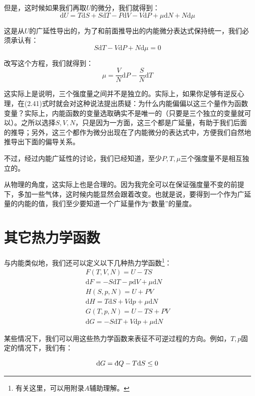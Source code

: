 \documentclass[a4paper, 10pt, openany]{book}%
\begin{document}
但是，这时候如果我们再取$U$的微分，我们就得到：
\begin{equation}
  \mathrm{d}U=T\mathrm{d}S+S\mathrm{d}T-P\mathrm{d}V-V\mathrm{d}P+\mu\mathrm{d}N+N\mathrm{d}\mu
\end{equation}

这是从$U$的广延性导出的，为了和前面推导出的内能微分表达式保持统一，我们必须承认有：
\begin{equation}
  S\mathrm{d}T-V\mathrm{d}P+N\mathrm{d}\mu=0
\end{equation}

改写这个方程，我们就得到：
\begin{equation}
  \mu=\frac{V}{N}\mathrm{d}P-\frac{S}{N}\mathrm{d}T\end{equation}

这实际上是说明，三个强度量之间并不是独立的。实际上，如果你足够有逆反心理，在(2.41)式时就会对这种说法提出质疑：为什么内能偏偏以这三个量作为函数变量？实际上，内能函数的变量选取确实不是唯一的（只要是三个独立的变量就可以）。之所以选择$S,V,N$，只是因为一方面，这三个都是广延量，有助于我们后面的推导；另外，这三个都作为微分出现在了内能微分的表达式中，方便我们自然地推导出下面的偏导关系。

不过，经过内能广延性的讨论，我们已经知道，至少$P,T,\mu$三个强度量不是相互独立的。

从物理的角度，这实际上也是合理的。因为我完全可以在保证强度量不变的前提下，多加一些气体，这时候内能显然会跟着改变。也就是说，要得到一个作为广延量的内能的值，我们至少要知道一个广延量作为“数量”的量度。
\section{ 其它热力学函数}
与内能类似地，我们还可以定义以下几种热力学函数\footnote{有关这里，可以用附录$A$辅助理解。}：
\begin{align}
  F(T,V,N)=U-TS\\
  \mathrm{d}F=-S\mathrm{d}T-p\mathrm{d}V+\mu\mathrm{d}N\\
  H(S,p,N)=U+PV\\
  \mathrm{d}H=T\mathrm{d}S+V\mathrm{d}p+\mu\mathrm{d}N\\
  G(T,p,N)=U-TS+PV\\
  \mathrm{d}G=-S\mathrm{d}T+V\mathrm{d}p+\mu\mathrm{d}N
\end{align}

某些情况下，我们可以用这些热力学函数来表征不可逆过程的方向。例如，$T,p$固定的情况下，我们有：

\begin{equation}
  \mathrm{d}G=\text{\dj}Q-T\mathrm{d}S\leq0
\end{equation}
\end{document}
